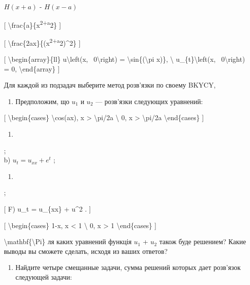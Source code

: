 \documentclass[
]{article}
\providecommand{\tightlist}{%
  \setlength{\itemsep}{0pt}\setlength{\parskip}{0pt}}
\begin{document}
\(H(x+a)\) - \(H(x-a)\)

{[} \textbackslash frac\{a\}\{x\textsuperscript{2+a}2\} {]}

{[} \textbackslash frac\{2ax\}\{(x\textsuperscript{2+a}2)\^{}2\} {]}

{[} \textbackslash begin\{array\}\{ll\} u\textbackslash left(x,
~0\textbackslash right) = \textbackslash sin\{(\textbackslash pi x)\},
\textbackslash{} u\_\{t\}\textbackslash left(x, ~0\textbackslash right)
= 0, \textbackslash end\{array\} {]}

Для каждой из подзадач выберите метод розв'язки по своему BKYCY,

\begin{enumerate}
\def\labelenumi{\arabic{enumi}.}
\setcounter{enumi}{2}
\tightlist
\item
  Предположим, що \(u_1\) и \(u_2\) --- розв'язки следующих уравнений:
\end{enumerate}

{[} \textbackslash begin\{cases\} \textbackslash cos(ax),
\textbar x\textbar{} \textgreater{} \textbackslash pi/2a
\textbackslash{} 0, \textbar x\textbar{} \textgreater{}
\textbackslash pi/2a \textbackslash end\{cases\} {]}

\begin{enumerate}
\def\labelenumi{\alph{enumi})}
\tightlist
\item
\end{enumerate}

;\\
b) \(u_t = u_{xx} + e^t\) ;

\begin{enumerate}
\def\labelenumi{\Alph{enumi})}
\setcounter{enumi}{1}
\tightlist
\item
\end{enumerate}

;

{[} F) u\_t = u\_\{xx\} + u\^{}2 . {]}

{[} \textbackslash begin\{cases\} 1-\textbar x\textbar,
\textbar x\textbar{} \textless{} 1 \textbackslash{} 0,
\textbar x\textbar{} \textgreater{} 1 \textbackslash end\{cases\} {]}

\textbackslash mathbf\{\textbackslash Pi\} ля каких уравнений функція
\(u_1\) + \(u_2\) також буде решением? Какие выводы вы сможете сделать,
исходя из ваших ответов?

\begin{enumerate}
\def\labelenumi{\arabic{enumi}.}
\setcounter{enumi}{3}
\tightlist
\item
  Найдите четыре смещанные задачи, сумма решений которых дает розв'язок
  следующей задачи:
\end{enumerate}
\end{document}

